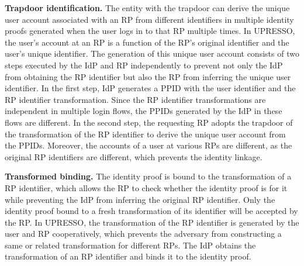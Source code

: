 \vspace{1mm}\noindent \textbf{Trapdoor identification.} The entity with the trapdoor can derive the unique user account associated with an RP from different identifiers in multiple identity proofs generated when the user logs in to that RP multiple times.
In UPRESSO, the user's account at an RP is a function of the RP's original identifier and the user's unique identifier.
The generation of this unique user account consists of two steps executed by the IdP and RP independently to prevent not only the IdP from obtaining the RP identifier but also the RP from inferring the unique user identifier.
In the first step, IdP generates a PPID with the user identifier and the RP identifier transformation. Since the RP identifier transformations are independent in multiple login flows, the PPIDs generated by the IdP in these flows are different.
In the second step, the requesting RP adopts the trapdoor of the transformation of the RP identifier to derive the unique user account from the PPIDs. Moreover, the accounts of a user at various RPs are different, as the original RP identifiers are different, which prevents the identity linkage.

\vspace{1mm}\noindent \textbf{Transformed binding.}
The identity proof is bound to the transformation of a RP identifier, which allows the RP to check whether the identity proof is for it while preventing the IdP from inferring the original RP identifier. Only the identity proof bound to a fresh transformation of its identifier will be accepted by the RP.
In UPRESSO, the transformation of the RP identifier is generated by the user and RP cooperatively, which prevents the adversary from constructing a same or related transformation for different RPs. The IdP obtains the transformation of an RP identifier and binds it to the identity proof.

